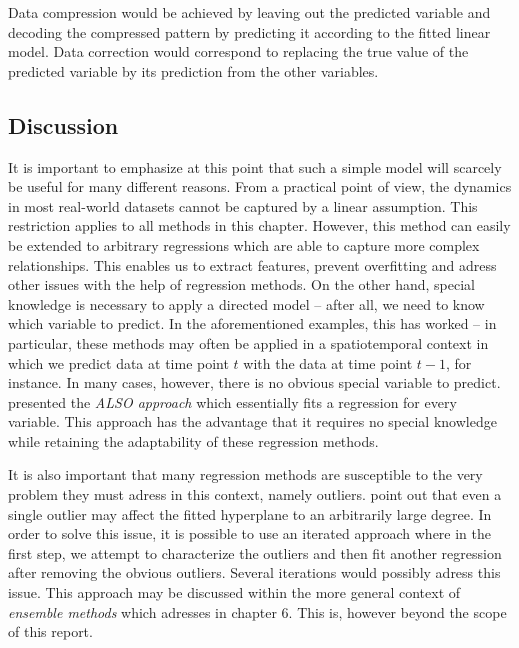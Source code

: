 \documentclass[]{report}
\theoremstyle{definition}
\theoremstyle{definition}
\theoremstyle{definition}
\theoremstyle{remark}
\begin{document}
Data compression would be achieved by leaving out the predicted variable
and decoding the compressed pattern by predicting it according to the
fitted linear model. Data correction would correspond to replacing the
true value of the predicted variable by its prediction from the other
variables.

\hypertarget{discussion}{%
\subsection{Discussion}\label{discussion}}

It is important to emphasize at this point that such a simple model will
scarcely be useful for many different reasons. From a practical point of
view, the dynamics in most real-world datasets cannot be captured by a
linear assumption. This restriction applies to all methods in this
chapter. However, this method can easily be extended to arbitrary
regressions which are able to capture more complex relationships. This
enables us to extract features, prevent overfitting and adress other
issues with the help of regression methods. On the other hand, special
knowledge is necessary to apply a directed model -- after all, we need
to know which variable to predict. In the aforementioned examples, this
has worked -- in particular, these methods may often be applied in a
spatiotemporal context \citep[ch.~9 and 11]{Aggarwal2017} in which we
predict data at time point \(t\) with the data at time point \(t-1\),
for instance. In many cases, however, there is no obvious special
variable to predict. \citet{Paulheim2015} presented the \emph{ALSO
approach} which essentially fits a regression for every variable. This
approach has the advantage that it requires no special knowledge while
retaining the adaptability of these regression methods.

It is also important that many regression methods are susceptible to the
very problem they must adress in this context, namely outliers.
\citet{Fahrmeir2013} point out that even a single outlier may affect the
fitted hyperplane to an arbitrarily large degree. In order to solve this
issue, it is possible to use an iterated approach where in the first
step, we attempt to characterize the outliers and then fit another
regression after removing the obvious outliers. Several iterations would
possibly adress this issue. This approach may be discussed within the
more general context of \emph{ensemble methods} which
\citet{Aggarwal2017} adresses in chapter 6. This is, however beyond the
scope of this report.
\end{document}
